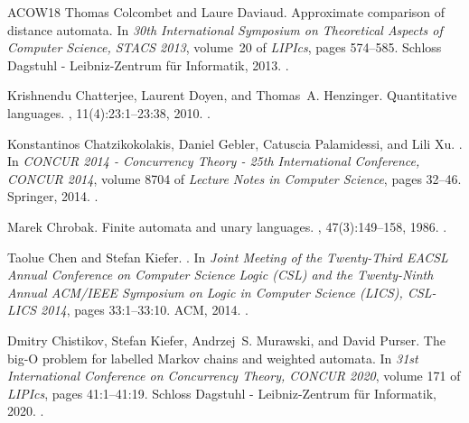 \documentclass[10pt,a4paper]{amsart}
\numberwithin{equation}{section}
\theoremstyle{plain}
\theoremstyle{definition}
\theoremstyle{remark}
\begin{document}
\begin{thebibliography}{ACOW18}
Thomas Colcombet and Laure Daviaud.
\newblock Approximate comparison of distance automata.
\newblock In {\em 30th International Symposium on Theoretical Aspects of
  Computer Science, {STACS} 2013}, volume~20 of {\em LIPIcs}, pages 574--585.
  Schloss Dagstuhl - Leibniz-Zentrum f{\"{u}}r Informatik, 2013.
\newblock \href {https://doi.org/10.4230/LIPIcs.STACS.2013.574}
  {}.

Krishnendu Chatterjee, Laurent Doyen, and Thomas~A. Henzinger.
\newblock Quantitative languages.
, 11(4):23:1--23:38, 2010.
\newblock \href {https://doi.org/10.1145/1805950.1805953}
  {}.

Konstantinos Chatzikokolakis, Daniel Gebler, Catuscia Palamidessi, and Lili Xu.
.
\newblock In {\em {CONCUR} 2014 - Concurrency Theory - 25th International
  Conference, {CONCUR} 2014}, volume 8704 of {\em Lecture Notes in Computer
  Science}, pages 32--46. Springer, 2014.
\newblock \href {https://doi.org/10.1007/978-3-662-44584-6_4}
  {}.

Marek Chrobak.
\newblock Finite automata and unary languages.
, 47(3):149--158, 1986.
\newblock \href {https://doi.org/10.1016/0304-3975(86)90142-8}
  {}.

Taolue Chen and Stefan Kiefer.
.
\newblock In {\em Joint Meeting of the Twenty-Third {EACSL} Annual Conference
  on Computer Science Logic {(CSL)} and the Twenty-Ninth Annual {ACM/IEEE}
  Symposium on Logic in Computer Science (LICS), {CSL-LICS} 2014}, pages
  33:1--33:10. {ACM}, 2014.
\newblock \href {https://doi.org/10.1145/2603088.2603099}
  {}.

Dmitry Chistikov, Stefan Kiefer, Andrzej~S. Murawski, and David Purser.
\newblock The big-{O} problem for labelled {M}arkov chains and weighted
  automata.
\newblock In {\em 31st International Conference on Concurrency Theory, {CONCUR}
  2020}, volume 171 of {\em LIPIcs}, pages 41:1--41:19. Schloss Dagstuhl -
  Leibniz-Zentrum f{\"{u}}r Informatik, 2020.
\newblock \href {https://doi.org/10.4230/LIPIcs.CONCUR.2020.41}
  {}.


\end{thebibliography}
\end{document}
